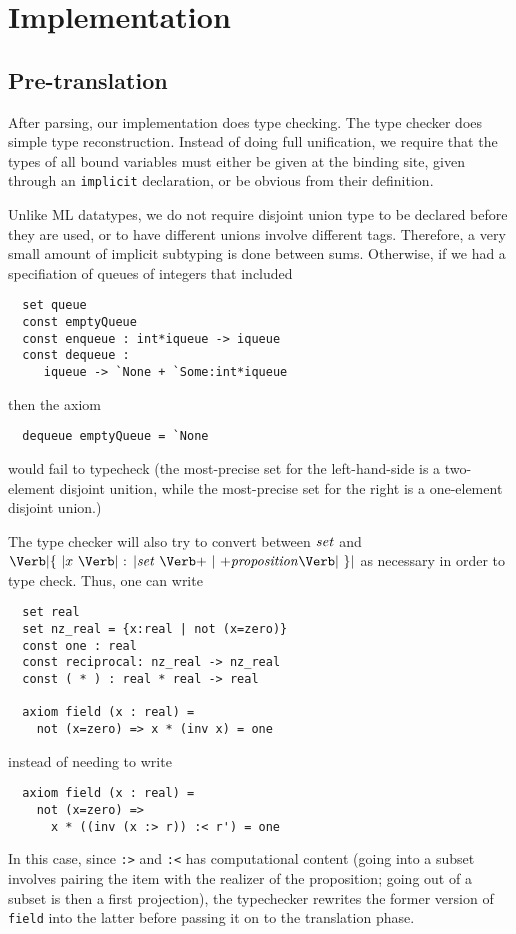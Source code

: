 
\section{Implementation}
\label{sec:implementation}

\subsection{Pre-translation}

After parsing, our implementation does type checking.  The type
checker does simple type reconstruction.  Instead of doing full
unification, we require that the types of all bound variables must
either be given at the binding site, given through an \Verb|implicit|
declaration, or be obvious from their definition.  

Unlike ML datatypes, we do not require disjoint union type
to be declared before they are used, or to have different unions
involve different tags.  Therefore, a very small amount of implicit 
subtyping is done between sums.  Otherwise, if we had a
specifiation of queues of integers that included
\begin{Verbatim}
  set queue
  const emptyQueue
  const enqueue : int*iqueue -> iqueue
  const dequeue : 
     iqueue -> `None + `Some:int*iqueue
\end{Verbatim}
then the axiom
\begin{Verbatim}
  dequeue emptyQueue = `None
\end{Verbatim}
would fail to typecheck (the most-precise set for the left-hand-side
is a two-element disjoint unition, while the most-precise set
for the right is a one-element disjoint union.)

The type checker will also try to convert between $\mbox{\textit{set}}$ and $\LBRACE
x \ \COLON \Setexp\ \BAR \Proposition \RBRACE$ as necessary in order
to type check.  Thus, one can write
\begin{Verbatim}
  set real
  set nz_real = {x:real | not (x=zero)}
  const one : real
  const reciprocal: nz_real -> nz_real
  const ( * ) : real * real -> real

  axiom field (x : real) =
    not (x=zero) => x * (inv x) = one
\end{Verbatim}
instead of needing to write
\begin{Verbatim}
  axiom field (x : real) =
    not (x=zero) => 
      x * ((inv (x :> r)) :< r') = one
\end{Verbatim}
In this case, since \Verb|:>| and \Verb|:<| has computational content
(going into a subset involves pairing the item with the realizer of
the proposition; going out of a subset is then a first projection),
the typechecker rewrites the former version of \Verb|field|
into the latter before passing it on to the translation phase.

